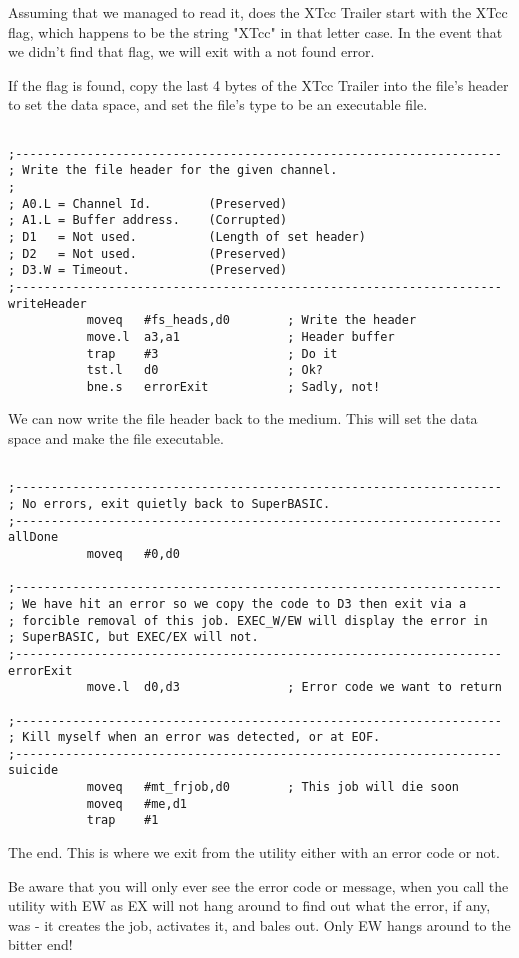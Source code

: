 Assuming that we managed to read it, does the XTcc Trailer start with the XTcc flag, which happens to be the string "XTcc" in that letter case. In the event that we didn't find that flag, we will exit with a not found error.

If the flag is found, copy the last 4 bytes of the XTcc Trailer into the file's header to set the data space, and set the file's type to be an executable file.


\begin{lstlisting}[firstnumber=last,caption={XTcc - Writing the Header}]

;--------------------------------------------------------------------
; Write the file header for the given channel.
;
; A0.L = Channel Id.        (Preserved)
; A1.L = Buffer address.    (Corrupted)
; D1   = Not used.          (Length of set header)
; D2   = Not used.          (Preserved)
; D3.W = Timeout.           (Preserved)
;--------------------------------------------------------------------
writeHeader
           moveq   #fs_heads,d0        ; Write the header
           move.l  a3,a1               ; Header buffer
           trap    #3                  ; Do it
           tst.l   d0                  ; Ok?
           bne.s   errorExit           ; Sadly, not!
\end{lstlisting}

We can now write the file header back to the medium. This will set the data space and make the file executable.


\begin{lstlisting}[firstnumber=last,caption={XTcc - Termination}]

;--------------------------------------------------------------------
; No errors, exit quietly back to SuperBASIC.
;--------------------------------------------------------------------
allDone
           moveq   #0,d0

;--------------------------------------------------------------------
; We have hit an error so we copy the code to D3 then exit via a
; forcible removal of this job. EXEC_W/EW will display the error in
; SuperBASIC, but EXEC/EX will not.
;--------------------------------------------------------------------
errorExit
           move.l  d0,d3               ; Error code we want to return

;--------------------------------------------------------------------
; Kill myself when an error was detected, or at EOF.
;--------------------------------------------------------------------
suicide
           moveq   #mt_frjob,d0        ; This job will die soon
           moveq   #me,d1
           trap    #1
\end{lstlisting}

The end. This is where we exit from the utility either with an error code or not.

Be aware that you will only ever see the error code or message, when you call the utility with EW as EX will not hang around to find out what the error, if any, was - it creates the job, activates it, and bales out. Only EW hangs around to the bitter end!

